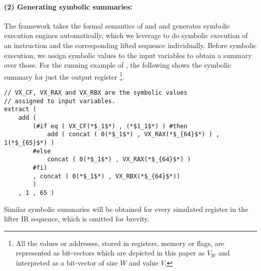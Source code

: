 \paragraph{(2) Generating symbolic summaries:}
The \K framework takes the formal semantics of \ISA and \LLVM and generates 
symbolic execution engines automatically, which we leverage to do 
symbolic execution of an \ISA instruction and the corresponding lifted \LLVM sequence 
individually. Before symbolic execution, we assign symbolic values to the input 
variables to obtain a summary over those. For the running example of 
, the following shows the symbolic summary for just the 
output register \footnote{All the values or
    addresses, stored in registers, memory or
    flags, are represented as bit-vectors which are depicted in
    this paper as $V_W$ and interpreted as a bit-vector of size $W$
    and value $V$.}. 

\vspace{45pt}

\begin{lstlisting}[style=KRULE]
// VX_CF, VX_RAX and VX_RBX are the symbolic values
// assigned to input variables.
extract ( 
    add ( 
        (#if eq ( VX_CF(*$_1$*) , (*$1_1$*) ) #then 
            add ( concat ( 0(*$_1$*) , VX_RAX(*$_{64}$*) ) , 1(*$_{65}$*) ) 
        #else 
            concat ( 0(*$_1$*) , VX_RAX(*$_{64}$*) ) 
        #fi)
        , concat ( 0(*$_1$*) , VX_RBX(*$_{64}$*)) 
        ) 
    , 1 , 65 ) 
\end{lstlisting}

Similar symbolic summaries will be obtained for
 every simulated register in the lifter IR sequence,
which is omitted for brevity.


